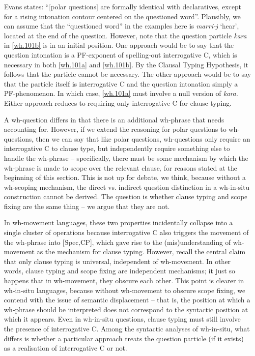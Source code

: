 \documentclass[charis]{glossa}
\begin{document}
Evans states: ``[polar questions] are formally identical with declaratives, except for a rising intonation contour centered on the questioned word''. Plausibly, we can assume that the ``questioned word'' in the examples here is \textit{marri-j} `hear', located at the end of the question. However, note that the question particle \textit{kara} in \ref{wh.101b} is in an initial position. One approach would be to say that the question intonation is a PF-exponent of spelling-out interrogative C, which is necessary in both \ref{wh.101a} and \ref{wh.101b}. By the Clausal Typing Hypothesis, it follows that the particle cannot be necessary. The other approach would be to say that the particle itself is interrogative C and the question intonation simply a PF-phenomenon. In which case, \ref{wh.101a} must involve a null version of \textit{kara}. Either approach reduces to requiring only interrogative C for clause typing.

A wh-question differs in that there is an additional wh-phrase that needs accounting for. However, if we extend the reasoning for polar questions to wh-questions, then we can say that like polar questions, wh-questions only require an interrogative C to clause type, but independently require something else to handle the wh-phrase -- specifically, there must be some mechanism by which the wh-phrase is made to scope over the relevant clause, for reasons stated at the beginning of this section. This is not up for debate, we think, because without a wh-scoping mechanism, the direct vs. indirect question distinction in a wh-in-situ construction cannot be derived. The question is whether clause typing and scope fixing are the same thing -- we argue that they are not.

In wh-movement languages, these two properties incidentally collapse into a single cluster of operations because interrogative C also triggers the movement of the wh-phrase into [Spec,CP], which gave rise to the (mis)understanding of wh-movement as the mechanism for clause typing. However, recall the central claim that only clause typing is universal, independent of wh-movement. In other words, clause typing and scope fixing are independent mechanisms; it just so happens that in wh-movement, they obscure each other. This point is clearer in wh-in-situ languages, because without wh-movement to obscure scope fixing, we contend with the issue of semantic displacement -- that is, the position at which a wh-phrase should be interpreted does not correspond to the syntactic position at which it appears. Even in wh-in-situ questions, clause typing must still involve the presence of interrogative C. Among the syntactic analyses of wh-in-situ, what differs is whether a particular approach treats the question particle (if it exists) as a realisation of interrogative C or not.
\end{document}
